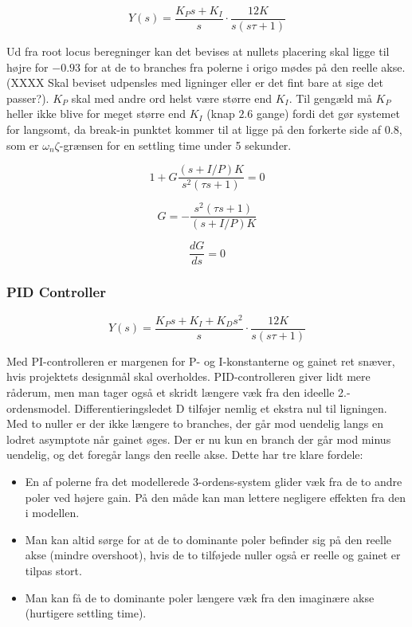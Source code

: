 \begin{equation}\label{eq:PI_OpenLoop}
Y(s)=\frac{K_{P}s+K_{I}}{s}\cdot\frac{12K}{s(s\tau+1)}
\end{equation}

Ud fra root locus beregninger kan det bevises at nullets placering skal ligge til højre for $-0.93$ for at de to branches fra polerne i origo mødes på den reelle akse. (XXXX Skal beviset udpensles med ligninger eller er det fint bare at sige det passer?). $K_{P}$ skal med andre ord helst være større end $K_{I}$. Til gengæld må $K_{P}$ heller ikke blive for meget større end $K_{I}$ (knap $2.6$ gange) fordi det gør systemet for langsomt, da break-in punktet kommer til at ligge på den forkerte side af $0.8$, som er $\omega_{n}\zeta$-grænsen for en settling time under 5 sekunder. 

\begin{equation}
1+G\frac{(s+I/P)K}{s^2(\tau s+1)}=0
\end{equation}

\begin{equation}
G=-\frac{s^2(\tau s+1)}{(s+I/P)K}
\end{equation}

\begin{equation}
\frac{dG}{ds}=0
\end{equation}

\subsubsection{PID Controller}

\begin{equation}\label{eq:PID_OpenLoop}
Y(s)=\frac{K_{P}s+K_{I}+K_{D}s^2}{s}\cdot\frac{12K}{s(s\tau+1)}
\end{equation}

Med PI-controlleren er margenen for P- og I-konstanterne og gainet ret snæver, hvis projektets designmål skal overholdes. PID-controlleren giver lidt mere råderum, men man tager også et skridt længere væk fra den ideelle 2.-ordensmodel. Differentieringsledet D tilføjer nemlig et ekstra nul til ligningen. Med to nuller er der ikke længere to branches, der går mod uendelig langs en lodret asymptote når gainet øges. Der er nu kun en branch der går mod minus uendelig, og det foregår langs den reelle akse. Dette har tre klare fordele:

\begin{itemize}
	\item 	En af polerne fra det modellerede 3-ordens-system glider væk fra de to andre poler ved højere gain. På den måde kan man lettere negligere effekten fra den i modellen.
	\item  	Man kan altid sørge for at de to dominante poler befinder sig på den 				   	reelle akse (mindre overshoot), hvis de to tilføjede nuller også er reelle og gainet er tilpas stort. 
	\item  	Man kan få de to dominante poler længere væk fra den imaginære akse 					(hurtigere settling time).
\end{itemize}

